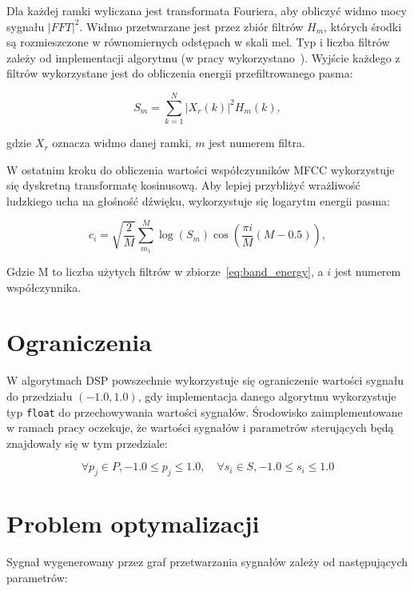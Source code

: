 Dla każdej ramki wyliczana jest transformata Fouriera, aby
obliczyć widmo mocy sygnału $|FFT|^2$. Widmo przetwarzane jest
przez zbiór filtrów $H_m$, których środki są rozmieszczone
w równomiernych odstępach w skali mel. Typ i liczba filtrów zależy
od implementacji algorytmu (w pracy wykorzystano~\cite{librosa}).
Wyjście każdego z filtrów wykorzystane
jest do obliczenia energii przefiltrowanego pasma:

\begin{equation}
  S_m = \sum_{k=1}^{N}| X_r(k) |^2 H_m(k),
  \label{eq:band_energy}
\end{equation}

\noindent
gdzie $X_r$ oznacza widmo danej ramki, $m$ jest numerem filtra.

W ostatnim kroku do obliczenia wartości współczynników MFCC
wykorzystuje się dyskretną transformatę kosinusową.
Aby lepiej przybliżyć wrażliwość ludzkiego ucha na głośność dźwięku,
wykorzystuje się logarytm energii pasma:

\begin{equation}
  c_i = \sqrt{\frac{2}{M}} \sum_{m_1}^{M} \log(S_m) \cos( \frac{\pi i}{M}(M - 0.5) ),
  \label{eq:mfcc_coefficients}
\end{equation}

Gdzie M to liczba użytych filtrów w zbiorze~\ref{eq:band_energy},
a $i$ jest numerem współczynnika.


\section{Ograniczenia}

W algorytmach DSP powszechnie wykorzystuje się ograniczenie wartości
sygnału do przedziału $(-1.0, 1.0)$, gdy implementacja danego algorytmu wykorzystuje 
typ \texttt{float} do przechowywania wartości sygnałów. Środowisko zaimplementowane
w ramach pracy oczekuje, że wartości sygnałów i parametrów sterujących
będą znajdowały się w tym przedziale:

\begin{equation}
  \forall p_j \in P,  -1.0 \leq p_j \leq 1.0, \quad \forall s_i \in S, -1.0 \leq s_i \leq 1.0
  \label{eq:parameter_bounds}
\end{equation}

\section{Problem optymalizacji}

Sygnał wygenerowany przez graf przetwarzania sygnałów zależy od następujących parametrów:

